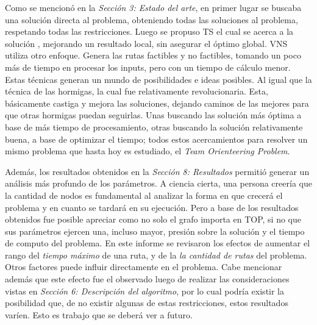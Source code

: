 \documentclass[letter, 10pt]{article}
\begin{document}
 Como se mencionó en la \textit{Sección 3: Estado del arte}, en primer lugar se buscaba una solución directa al problema, obteniendo todas las soluciones al problema, respetando todas las restricciones. Luego se propuso TS el cual se acerca a la solución , mejorando un resultado local, sin asegurar el óptimo global. VNS utiliza otro enfoque. Genera las rutas factibles y no factibles, tomando un poco más de tiempo en procesar los inputs, pero con un tiempo de cálculo menor. Estas técnicas generan un mundo de posibilidades e ideas posibles. Al igual que la técnica de las hormigas, la cual fue relativamente revolucionaria. Esta, básicamente castiga y mejora las soluciones, dejando caminos de las mejores para que otras hormigas puedan seguirlas. Unas buscando las solución más óptima a base de más tiempo de procesamiento, otras buscando la solución relativamente buena, a base de optimizar el tiempo; todos estos acercamientos para resolver un mismo problema que hasta hoy es estudiado, el \textit{Team Orienteering Problem}.

Además, los resultados obtenidos en la \textit{Sección 8: Resultados} permitió generar un análisis más profundo de los parámetros. A ciencia cierta, una persona creería que la cantidad de nodos es fundamental al analizar la forma en que crecerá el problema y en cuanto se tardará en su ejecución. Pero  a base de los resultados obtenidos fue posible apreciar como no solo el grafo importa en TOP, si no que sus parámetros ejercen una, incluso mayor, presión sobre la solución y el tiempo de computo del problema. 
En este informe se revisaron los efectos de aumentar el rango del \textit{tiempo máximo} de una ruta, y de la \textit{la cantidad de rutas} del problema. Otros factores puede influir directamente en el problema. Cabe mencionar además que este efecto fue el observado luego de realizar las consideraciones vistas en \textit{Sección 6: Descripción del algoritmo}, por lo cual podría existir la posibilidad que, de no existir algunas de estas restricciones, estos resultados varíen. Esto es trabajo que se deberá ver a futuro.







\end{document}

